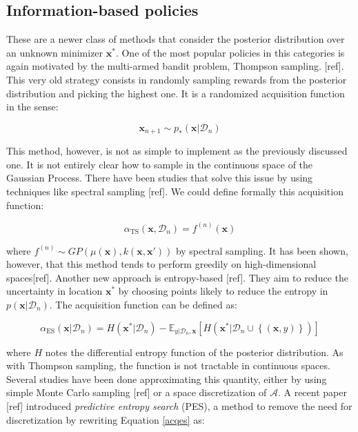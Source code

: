 \documentclass[10pt,a4paper,twoside]{book}
\begin{document}
\subsection{Information-based policies}

These are a newer class of methods that consider the posterior distribution over an unknown minimizer $\boldsymbol{x}^*$. One of the most popular policies in this categories is again motivated by the multi-armed bandit problem, Thompson sampling. [ref]. This very old strategy consists in randomly sampling rewards from the posterior distribution and picking the highest one. It is a randomized acquisition function in the sense:

\begin{equation}
\boldsymbol{x}_{n+1} \sim p_{*}(\boldsymbol{x}|\mathcal{D}_n)
\end{equation}

This method, however, is not as simple to implement as the previously discussed one. It is not entirely clear how to sample in the continuous space of the Gaussian Process. There have been studies that solve this issue by using techniques like spectral sampling [ref]. We could define formally this acquisition function:

\begin{equation}
\alpha_{\mathrm{TS}}(\boldsymbol{x}, \mathcal{D}_n) = f^{(n)}(\boldsymbol{x})
\end{equation}

where $f^{(n)} \sim GP\left(\mu(\boldsymbol{x}), k(\boldsymbol{x}, \boldsymbol{x'})\right)$ by spectral sampling. It has been shown, however, that this method tends to perform greedily on high-dimensional spaces[ref]. Another new approach is entropy-based [ref]. They aim to reduce the uncertainty in location $\boldsymbol{x}^{*}$ by choosing points likely to reduce the entropy in $p(\boldsymbol{x}|\mathcal{D}_n)$. The acquisition function can be defined as:

\begin{equation}
\label{acqes}
\alpha_{\mathrm{ES}}(\boldsymbol{x}|\mathcal{D}_n) = H(\boldsymbol{x}^*|\mathcal{D}_n) - \mathbb{E}_{y|\mathcal{D}_n, \boldsymbol{x}}\left[ H(\boldsymbol{x}^*|\mathcal{D}_n \cup \left\lbrace (\boldsymbol{x}, y) \right\rbrace) \right]
\end{equation}

where $H$ notes the differential entropy function of the posterior distribution. As with Thompson sampling, the function is not tractable in continuous spaces. Several studies have been done approximating this quantity, either by using simple Monte Carlo sampling [ref] or a space discretization of $\mathcal{A}$. A recent paper [ref] introduced \textit{predictive entropy search} (PES), a method to remove the need for discretization by rewriting Equation \ref{acqes} as:
\end{document}
